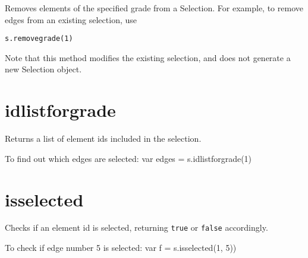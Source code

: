 Removes elements of the specified grade from a Selection. For example,
to remove edges from an existing selection, use

\begin{lstlisting}
s.removegrade(1)
\end{lstlisting}

Note that this method modifies the existing selection, and does not
generate a new Selection object.

\hypertarget{idlistforgrade}{%
\section{idlistforgrade}\label{idlistforgrade}}

Returns a list of element ids included in the selection.

To find out which edges are selected: var edges = s.idlistforgrade(1)

\hypertarget{isselected}{%
\section{isselected}\label{isselected}}

Checks if an element id is selected, returning \texttt{true} or
\texttt{false} accordingly.

To check if edge number 5 is selected: var f = s.isselected(1, 5))
